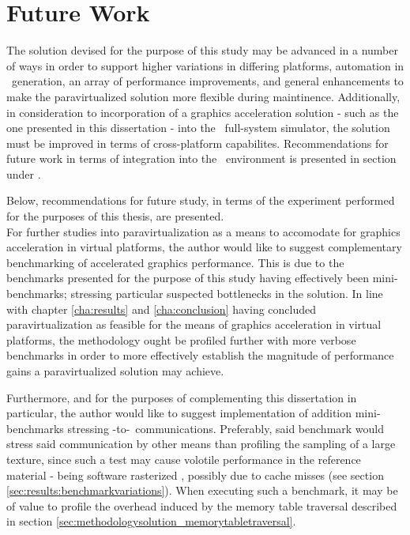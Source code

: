 
\chapter{Future Work}
\label{cha:futurework}
The solution devised for the purpose of this study may be advanced in a number of ways in order to support higher variations in differing platforms, automation in \dvttermabi\ generation, an array of performance improvements, and general enhancements to make the paravirtualized solution more flexible during maintinence.
Additionally, in consideration to incorporation of a graphics acceleration solution - such as the one presented in this dissertation - into the \dvttermsimics\ full-system simulator, the solution must be improved in terms of cross-platform capabilites.
Recommendations for future work in terms of integration into the \dvttermsimics\ environment is presented in section  under .

Below, recommendations for future study, in terms of the experiment performed for the purposes of this thesis, are presented.\\

\noindent
For further studies into paravirtualization as a means to accomodate for graphics acceleration in virtual platforms, the author would like to suggest complementary benchmarking of accelerated graphics performance.
This is due to the benchmarks presented for the purpose of this study having effectively been mini-benchmarks; stressing particular suspected bottlenecks in the solution.
In line with chapter \ref{cha:results} and \ref{cha:conclusion} having concluded paravirtualization as feasible for the means of graphics acceleration in virtual platforms, the methodology ought be profiled further with more verbose benchmarks in order to more effectively establish the magnitude of performance gains a paravirtualized solution may achieve.

Furthermore, and for the purposes of complementing this dissertation in particular, the author would like to suggest implementation of addition mini-benchmarks stressing \dvttermtarget -to-\dvttermhost\ communications.
Preferably, said benchmark would stress said communication by other means than profiling the sampling of a large texture, since such a test may cause volotile performance in the reference material - being software rasterized \dvttermsimics , possibly due to cache misses (see section \ref{sec:results:benchmarkvariations}).
When executing such a benchmark, it may be of value to profile the overhead induced by the memory table traversal described in section \ref{sec:methodologysolution_memorytabletraversal}.\\

